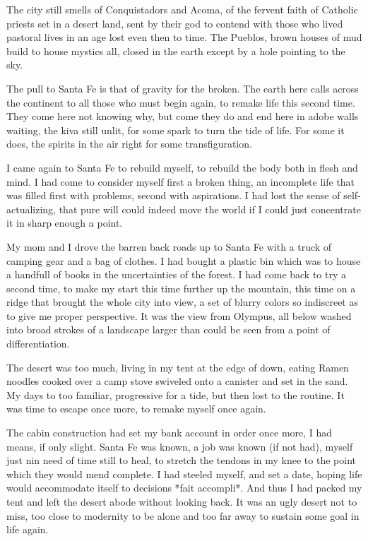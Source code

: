 \documentclass[ebook, 10pt, openright, onecolumn]{memoir}
\begin{document}
The city still smells of Conquistadors and Acoma, of the fervent faith of
Catholic priests set in a desert land, sent by their god to contend with those
who lived pastoral lives in an age lost even then to time.  The Pueblos, brown
houses of mud build to house mystics all, closed in the earth except by a hole
pointing to the sky.

The pull to Santa Fe is that of gravity for the broken.  The earth here calls
across the continent to all those who must begin again, to remake life this
second time.  They come here not knowing why, but come they do and end here in
adobe walls waiting, the kiva still unlit, for some spark to turn the tide of
life.  For some it does, the spirits in the air right for some transfiguration.

I came again to Santa Fe to rebuild myself, to rebuild the body both in flesh
and mind.  I had come to consider myself first a broken thing, an incomplete
life that was filled first with problems, second with aspirations.  I had lost
the sense of self-actualizing, that pure will could indeed move the world if I
could just concentrate it in sharp enough a point.

My mom and I drove the barren back roads up to Santa Fe with a truck of camping
gear and a bag of clothes.  I had bought a plastic bin which was to house a
handfull of books in the uncertainties of the forest.  I had come back to try a
second time, to make my start this time further up the mountain, this time on a
ridge that brought the whole city into view, a set of blurry colors so
indiscreet as to give me proper perspective.  It was the view from Olympus, all
below washed into broad strokes of a landscape larger than could be seen from a
point of differentiation.  

The desert was too much, living in my tent at the edge of down, eating Ramen
noodles cooked over a camp stove swiveled onto a canister and set in the sand.
My days to too familiar, progressive for a tide, but then lost to the routine.
It was time to escape once more, to remake myself once again.

The cabin construction had set my bank account in order once more, I had means,
if only slight.  Santa Fe was known, a job was known (if not had), myself just
nin need of time still to heal, to stretch the tendons in my knee to the point
which they would mend complete. I had steeled myself, and set a date, hoping
life would accommodate itself to decisions *fait accompli*.  And thus I had
packed my tent and left the desert abode without looking back.  It was an ugly
desert not to miss, too close to modernity to be alone and too far away to
sustain some goal in life again.
\end{document}
